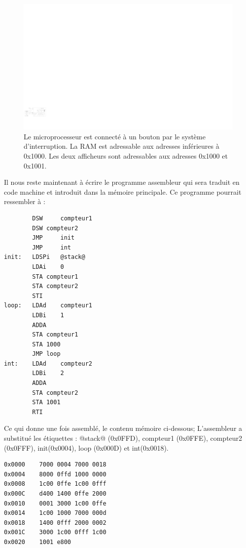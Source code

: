 \begin{figure}[htbp]
\includegraphics[width=\linewidth]{Figs/premier_chemin_seq_irq_bouton.pdf}
\caption{\label{fig:interrupt_bouton} Le microprocesseur est connecté à un bouton par le système d'interruption. La RAM est adressable aux adresses inférieures à 0x1000. Les deux afficheurs sont adressables aux adresses 0x1000 et 0x1001.}
\end{figure}

Il nous reste maintenant à écrire le programme assembleur qui sera traduit en code machine et introduit dans la mémoire principale. Ce programme pourrait ressembler à :
\begin{verbatim}
        DSW 	compteur1
        DSW	compteur2
        JMP 	init
        JMP 	int
init:	LDSPi	@stack@
        LDAi	0
        STA	compteur1
        STA	compteur2
        STI
loop:	LDAd	compteur1
        LDBi	1
        ADDA
        STA	compteur1
        STA	1000
        JMP	loop
int:	LDAd	compteur2	
        LDBi	2
        ADDA
        STA	compteur2
        STA	1001
        RTI
\end{verbatim}
Ce qui donne une fois assemblé, le contenu mémoire ci-dessous; L'assembleur a substitué les étiquettes : @stack@ (0x0FFD), compteur1 (0x0FFE), compteur2 (0x0FFF), init(0x0004), loop (0x000D) et int(0x0018).
\begin{verbatim}
0x0000    7000 0004 7000 0018 
0x0004    8000 0ffd 1000 0000 
0x0008    1c00 0ffe 1c00 0fff
0x000C    d400 1400 0ffe 2000 
0x0010    0001 3000 1c00 0ffe 
0x0014    1c00 1000 7000 000d
0x0018    1400 0fff 2000 0002 
0x001C    3000 1c00 0fff 1c00 
0x0020    1001 e800
\end{verbatim}

